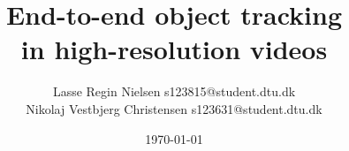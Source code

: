 \documentclass[a4paper]{article}
\numberwithin{equation}{section}
\begin{document}
\title{End-to-end object tracking \\ in high-resolution videos}
\author{Lasse Regin Nielsen s123815@student.dtu.dk \\ Nikolaj Vestbjerg Christensen s123631@student.dtu.dk}
\date{\today}

\maketitle








%

\pagebreak
\printbibliography
\end{document}
